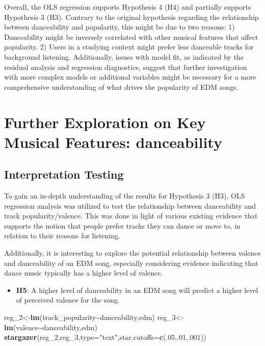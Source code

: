 \documentclass[
]{book}
\newenvironment{Shaded}{\begin{snugshade}}{\end{snugshade}}
\newcommand{\AttributeTok}[1]{\textcolor[rgb]{0.13,0.29,0.53}{#1}}
\newcommand{\DecValTok}[1]{\textcolor[rgb]{0.00,0.00,0.81}{#1}}
\newcommand{\FunctionTok}[1]{\textcolor[rgb]{0.13,0.29,0.53}{\textbf{#1}}}
\newcommand{\NormalTok}[1]{#1}
\newcommand{\OtherTok}[1]{\textcolor[rgb]{0.56,0.35,0.01}{#1}}
\newcommand{\SpecialCharTok}[1]{\textcolor[rgb]{0.81,0.36,0.00}{\textbf{#1}}}
\newcommand{\StringTok}[1]{\textcolor[rgb]{0.31,0.60,0.02}{#1}}
\providecommand{\tightlist}{%
  \setlength{\itemsep}{0pt}\setlength{\parskip}{0pt}}
\begin{document}
Overall, the OLS regression supports Hypothesis 4 (H4) and partially supports Hypothesis 3 (H3). Contrary to the original hypothesis regarding the relationship between danceability and popularity, this might be due to two reasons: 1) Danceability might be inversely correlated with other musical features that affect popularity. 2) Users in a studying context might prefer less danceable tracks for background listening. Additionally, issues with model fit, as indicated by the residual analysis and regression diagnostics, suggest that further investigation with more complex models or additional variables might be necessary for a more comprehensive understanding of what drives the popularity of EDM songs.

\hypertarget{further-exploration-on-key-musical-features-danceability}{%
\chapter{Further Exploration on Key Musical Features: danceability}\label{further-exploration-on-key-musical-features-danceability}}

\hypertarget{interpretation-testing}{%
\section{Interpretation Testing}\label{interpretation-testing}}

To gain an in-depth understanding of the results for Hypothesis 3 (H3), OLS regression analysis was utilized to test the relationship between danceability and track popularity/valence. This was done in light of various existing evidence that supports the notion that people prefer tracks they can dance or move to, in relation to their reasons for listening. \citep[e.g.,][]{duman2022music, loepthien2022flow}

Additionally, it is interesting to explore the potential relationship between valence and danceability of an EDM song, especially considering evidence indicating that dance music typically has a higher level of valence.

\begin{itemize}
\tightlist
\item
  \textbf{H5}: A higher level of danceability in an EDM song will predict a higher level of perceived valence for the song.
\end{itemize}

\begin{Shaded}
\begin{Highlighting}[]
\NormalTok{reg\_2}\OtherTok{\textless{}{-}}\FunctionTok{lm}\NormalTok{(track\_popularity}\SpecialCharTok{\textasciitilde{}}\NormalTok{danceability,edm)}
\NormalTok{reg\_3}\OtherTok{\textless{}{-}}\FunctionTok{lm}\NormalTok{(valence}\SpecialCharTok{\textasciitilde{}}\NormalTok{danceability,edm)}
\FunctionTok{stargazer}\NormalTok{(reg\_2,reg\_3,}\AttributeTok{type=}\StringTok{"text"}\NormalTok{,}\AttributeTok{star.cutoffs=}\FunctionTok{c}\NormalTok{(.}\DecValTok{05}\NormalTok{,.}\DecValTok{01}\NormalTok{,.}\DecValTok{001}\NormalTok{))}
\end{Highlighting}
\end{Shaded}
\end{document}
